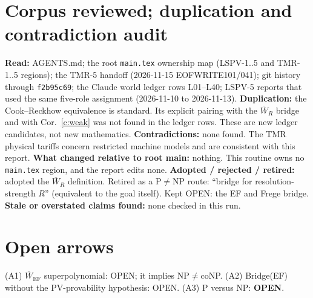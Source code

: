 \documentclass[11pt]{article}
\theoremstyle{definition}\newtheorem{definition}{Definition}
\begin{document}
\section{Corpus reviewed; duplication and contradiction audit}
\textbf{Read:} AGENTS.md; the root \texttt{main.tex} ownership map (LSPV-1..5 and TMR-1..5 regions); the TMR-5 handoff (2026-11-15 EOFWRITE101/041); git history through \texttt{f2b95c69}; the Claude world ledger rows L01--L40; LSPV-5 reports that used the same five-role assignment (2026-11-10 to 2026-11-13).
\textbf{Duplication:} the Cook--Reckhow equivalence is standard. Its explicit pairing with the $\overline W_R$ bridge and with Cor.~\ref{c:weak} was not found in the ledger rows. These are new ledger candidates, not new mathematics.
\textbf{Contradictions:} none found. The TMR physical tariffs concern restricted machine models and are consistent with this report.
\textbf{What changed relative to root main:} nothing. This routine owns no \texttt{main.tex} region, and the report edits none.
\textbf{Adopted / rejected / retired:} adopted the $\overline W_R$ definition. Retired as a P$\ne$NP route: ``bridge for resolution-strength $R$'' (equivalent to the goal itself). Kept OPEN: the EF and Frege bridge.
\textbf{Stale or overstated claims found:} none checked in this run.

\section{Open arrows}
(A1) $\overline W_{\mathrm{EF}}$ superpolynomial: OPEN; it implies NP$\neq$coNP. (A2) Bridge(EF) without the PV-provability hypothesis: OPEN. (A3) P versus NP: \textbf{OPEN}.
\end{document}
